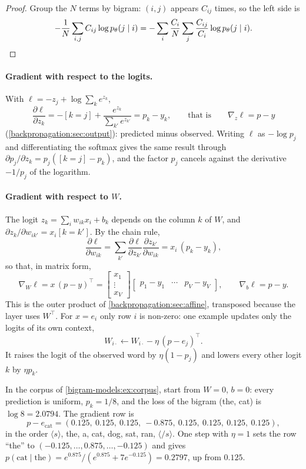 \begin{notechapter}
\begin{proof}
Group the $N$ terms by bigram: $(i, j)$ appears $C_{ij}$ times, so the left side is
\[
  -\frac1N\sum_{i,j}C_{ij}\log p_\theta(j\mid i) = -\sum_i\frac{C_i}N\sum_j\frac{C_{ij}}{C_i}\log p_\theta(j\mid i) . \qedhere
\]
\end{proof}

\paragraph{Gradient with respect to the logits.} With $\ell = -z_j + \log\sum_ke^{z_k}$,
\[
  \frac{\partial\ell}{\partial z_k} = -[k = j] + \frac{e^{z_k}}{\sum_{k'}e^{z_{k'}}} = p_k - y_k,\qquad\text{that is}\qquad\nabla_z\ell = p - y
\]
(\cref{backpropagation:sec:output}): predicted minus observed. Writing $\ell$ as $-\log p_j$ and differentiating
the softmax gives the same result through $\partial p_j/\partial z_k = p_j([k = j] - p_k)$, and the factor $p_j$ cancels against the
derivative $-1/p_j$ of the logarithm.

\paragraph{Gradient with respect to $W$.} The logit $z_k = \sum_iw_{ik}x_i + b_k$ depends on the column $k$ of $W$, and
$\partial z_k/\partial w_{ik'} = x_i[k = k']$. By the chain rule,
\[
  \frac{\partial\ell}{\partial w_{ik}} = \sum_{k'}\frac{\partial\ell}{\partial z_{k'}}\frac{\partial z_{k'}}{\partial w_{ik}} = x_i\,(p_k - y_k),
\]
so that, in matrix form,
\[
  \nabla_W\ell = x\,(p - y)^\top = \begin{bmatrix}x_1\\ \vdots\\ x_V\end{bmatrix}\begin{bmatrix}p_1 - y_1 & \cdots & p_V - y_V\end{bmatrix},\qquad
  \nabla_b\ell = p - y .
\]
This is the outer product of \cref{backpropagation:sec:affine}, transposed because the layer uses $W^\top$.
For $x = e_i$ only row $i$ is non-zero: one example updates only the logits of its own context,
\[
  W_{i\cdot}\leftarrow W_{i\cdot} - \eta\,(p - e_j)^\top .
\]
It raises the logit of the observed word by $\eta(1 - p_j)$ and lowers every other logit $k$ by $\eta p_k$.

\begin{example}\label{bigram-models:ex:step}
In the corpus of \cref{bigram-models:ex:corpus}, start from $W = 0$, $b = 0$: every prediction is uniform,
$p_k = 1/8$, and the loss of the bigram (the, cat) is $\log8 = 2.0794$. The gradient row is
\[
  p - e_{\text{cat}} = (0.125,\ 0.125,\ 0.125,\ -0.875,\ 0.125,\ 0.125,\ 0.125,\ 0.125),
\]
in the order $\langle s\rangle$, the, a, cat, dog, sat, ran, $\langle/s\rangle$. One step with $\eta = 1$ sets the row ``the'' to $(-0.125,\dots,0.875,\dots,-0.125)$
and gives $p(\text{cat}\mid\text{the}) = e^{0.875}/(e^{0.875} + 7e^{-0.125}) = 0.2797$, up from $0.125$.
\end{example}


\end{notechapter}

